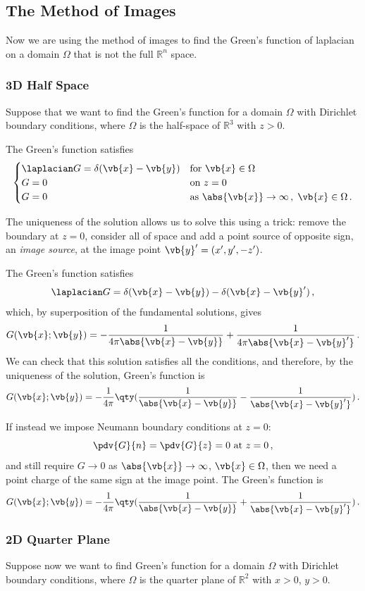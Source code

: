 \documentclass{article}
\theoremstyle{plain}\theoremheaderfont{\normalfont\itshape}\theorembodyfont{\rmfamily}\theoremseparator{.}\newtheorem*{rem}{Remark}\newtheorem*{ex}{Example}\newtheorem*{proof}{Proof}\newtheorem*{altp}{Alternative proof}
\theoremstyle{plain}\theoremheaderfont{\normalfont\bfseries}\theorembodyfont{\rmfamily}\theoremseparator{.}\newtheorem{thm}{Theorem}[section]\newtheorem{lem}[thm]{Lemma}\newtheorem{prop}[thm]{Proposition}\newtheorem*{cor}{Corollary}\newtheorem{defn}[thm]{Definition}\newtheorem{clm}[thm]{Claim}\newtheorem{clminproof}{Claim}
\theoremstyle{break}\theoremheaderfont{\normalfont\itshape}\theorembodyfont{\rmfamily}\theoremseparator{.\medskip}\newtheorem*{proofskip}{Proof}\newtheorem*{exs}{Examples}\newtheorem*{rems}{Remarks}
\theoremstyle{break}\theoremheaderfont{\normalfont\bfseries}\theorembodyfont{\rmfamily}\theoremseparator{.\medskip}\newtheorem{lemskip}[thm]{Lemma}\newtheorem{defnskip}[thm]{Definition}\newtheorem{propskip}[thm]{Proposition}\newtheorem{thmskip}[thm]{Theorem}
\numberwithin{equation}{section}
\begin{document}
	\subsection{The Method of Images}
	Now we are using the method of images to find the Green's function of laplacian on a domain \(\Omega\) that is not the full \(\mathbb{R}^n\) space.
	\subsubsection{3D Half Space}
	Suppose that we want to find the Green's function for a domain \(\Omega\) with Dirichlet boundary conditions, where \(\Omega\) is the half-space of \(\mathbb{R}^3\) with \(z>0\).

	The Green's function satisfies
	\[\begin{cases}
		\laplacian G=\delta(\vb{x}-\vb{y}) & \text{for }\vb{x}\in\Omega\\
		G=0 & \text{on }z=0\\
		G=0 & \text{as }\abs{\vb{x}}\to\infty\,,\;\vb{x}\in\Omega\,.
	\end{cases}\]

	The uniqueness of the solution allows us to solve this using a trick: remove the boundary at \(z=0\), consider all of space and add a point source of opposite sign, an \textit{image source}, at the image point \(\vb{y}'=(x',y',-z')\).

	The Green's function satisfies
	\[\laplacian G=\delta(\vb{x}-\vb{y})-\delta(\vb{x}-\vb{y}')\,,\]
	which, by superposition of the fundamental solutions, gives
	\[G(\vb{x};\vb{y})=-\frac{1}{4\pi\abs{\vb{x}-\vb{y}}}+\frac{1}{4\pi\abs{\vb{x}-\vb{y}'}}\,.\]
	We can check that this solution satisfies all the conditions, and therefore, by the uniqueness of the solution, Green's function is
	\[G(\vb{x};\vb{y})=-\frac{1}{4\pi}\qty(\frac{1}{\abs{\vb{x}-\vb{y}}}-\frac{1}{\abs{\vb{x}-\vb{y}'}})\,.\]

	If instead we impose Neumann boundary conditions at \(z=0\):
	\[\pdv{G}{n}=\pdv{G}{z}=0\text{ at }z=0\,,\]
	and still require \(G\to 0\) as \(\abs{\vb{x}}\to\infty\), \(\vb{x}\in\Omega\), then we need a point charge of the same sign at the image point. The Green's function is
	\[G(\vb{x};\vb{y})=-\frac{1}{4\pi}\qty(\frac{1}{\abs{\vb{x}-\vb{y}}}+\frac{1}{\abs{\vb{x}-\vb{y}'}})\,.\]
	
	\subsubsection{2D Quarter Plane}
	Suppose now we want to find Green's function for a domain \(\Omega\) with Dirichlet boundary conditions, where \(\Omega\) is the quarter plane of \(\mathbb{R}^2\) with \(x>0\), \(y>0\).
\end{document}
